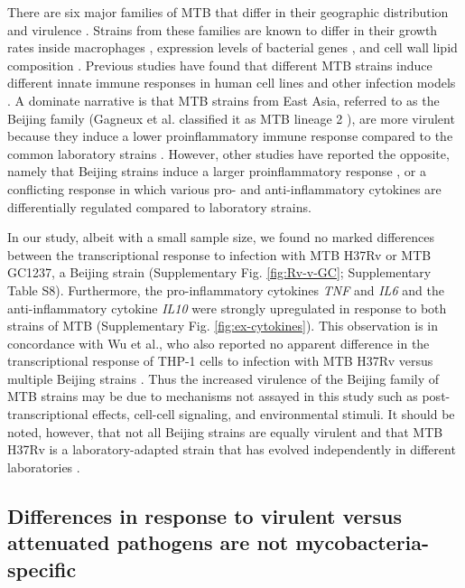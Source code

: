 There are six major families of MTB that differ in their geographic
distribution and virulence \citep{Gagneux2006, Comas2009}. Strains from
these families are known to differ in their growth rates inside
macrophages \citep{Li2002}, expression levels of bacterial genes
\citep{Homolka2010, Rose2013}, and cell wall lipid composition
\citep{Krishnan2011}. Previous studies have found that different MTB
strains induce different innate immune responses in human cell lines and
other infection models \citep{Coscolla2010}. A dominate narrative is that
MTB strains from East Asia, referred to as the Beijing family (Gagneux
et al. classified it as MTB lineage 2 \citep{Gagneux2006}), are more
virulent because they induce a lower proinflammatory immune response
compared to the common laboratory strains \citep{Manca2001, Manca2004,
Reed2004, Tanveer2009, Wang2010b}. However, other studies have
reported the opposite, namely that Beijing strains induce a larger
proinflammatory response \citep{Chacon-Salinas2005}, or a conflicting
response in which various pro- and anti-inflammatory cytokines are
differentially regulated \citep{Rocha-Ramirez2008, Koo2012} compared to
laboratory strains.

In our study, albeit with a small sample size, we found no marked
differences between the transcriptional response to infection with MTB
H37Rv or MTB GC1237, a Beijing strain (Supplementary Fig. \ref{fig:Rv-v-GC};
Supplementary Table S8). Furthermore, the pro-inflammatory cytokines
\emph{TNF} and \emph{IL6} and the anti-inflammatory cytokine \emph{IL10}
were strongly upregulated in response to both strains of MTB
(Supplementary Fig. \ref{fig:ex-cytokines}). This observation is in concordance with Wu et
al., who also reported no apparent difference in the transcriptional
response of THP-1 cells to infection with MTB H37Rv versus multiple
Beijing strains \citep{Wu2012}. Thus the increased virulence of the
Beijing family of MTB strains may be due to mechanisms not assayed in
this study such as post-transcriptional effects, cell-cell signaling,
and environmental stimuli. It should be noted, however, that not all
Beijing strains are equally virulent \citep{Dormans2004, Sinsimer2008}
and that MTB H37Rv is a laboratory-adapted strain that has evolved
independently in different laboratories \citep{Ioerger2010}.

\subsection{Differences in response to virulent versus attenuated
pathogens are not
mycobacteria-specific}\label{differences-in-response-to-virulent-versus-attenuated-pathogens-are-not-mycobacteria-specific}

